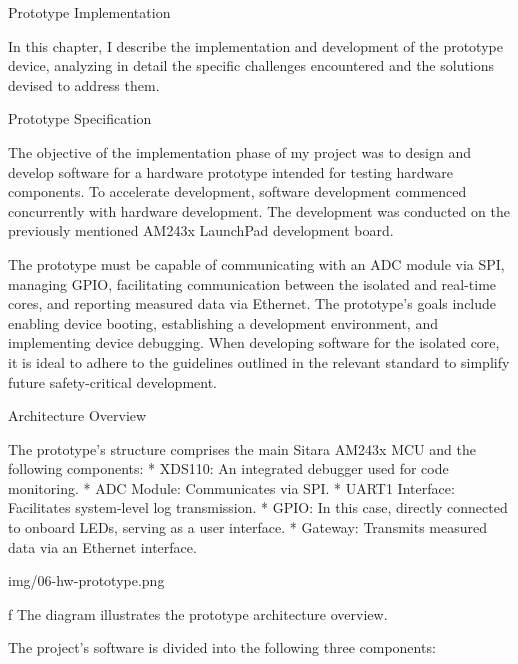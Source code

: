
\def\ctustyle{{\ssr CTUstyle}}
\def\ttb{\tt\char`\\} %


\chap Prototype Implementation

In this chapter, I describe the implementation and development of the prototype device, analyzing in detail the specific challenges encountered and the solutions devised to address them.

\sec Prototype Specification

The objective of the implementation phase of my project was to design and develop software for a hardware prototype intended for testing hardware components. To accelerate development, software development commenced concurrently with hardware development. The development was conducted on the previously mentioned AM243x LaunchPad development board.

The prototype must be capable of communicating with an ADC module via SPI, managing GPIO, facilitating communication between the isolated and real-time cores, and reporting measured data via Ethernet. The prototype’s goals include enabling device booting, establishing a development environment, and implementing device debugging. When developing software for the isolated core, it is ideal to adhere to the guidelines outlined in the relevant standard to simplify future safety-critical development.

\sec Architecture Overview

The prototype’s structure comprises the main Sitara AM243x MCU and the following components:
\begitems
* {\sbf XDS110}: An integrated debugger used for code monitoring.
* {\sbf ADC Module}: Communicates via SPI.
* {\sbf UART1} Interface: Facilitates system-level log transmission.
* {\sbf GPIO}: In this case, directly connected to onboard LEDs, serving as a user interface.
* {\sbf Gateway}: Transmits measured data via an Ethernet interface.
\enditems

\medskip
{}
\picw=14cm \cinspic img/06-hw-prototype.png
\caption/f The diagram illustrates the prototype architecture overview.
\medskip

The project’s software is divided into the following three components:

